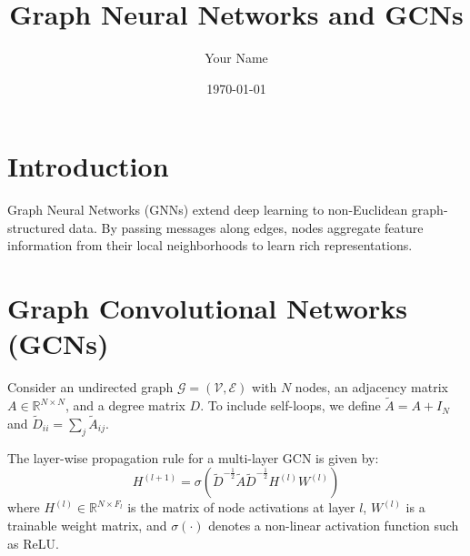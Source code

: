 \documentclass{article}
\begin{document}
\title{Graph Neural Networks and GCNs}
\author{Your Name}
\date{\today}
\maketitle

\section{Introduction}
Graph Neural Networks (GNNs) extend deep learning to non-Euclidean graph-structured data. By passing messages along edges, nodes aggregate feature information from their local neighborhoods to learn rich representations.

\section{Graph Convolutional Networks (GCNs)}
Consider an undirected graph $\mathcal{G} = (\mathcal{V}, \mathcal{E})$ with $N$ nodes, an adjacency matrix $A \in \mathbb{R}^{N \times N}$, and a degree matrix $D$. To include self-loops, we define $\tilde{A} = A + I_N$ and $\tilde{D}_{ii} = \sum_j \tilde{A}_{ij}$.

The layer-wise propagation rule for a multi-layer GCN is given by:
\[
H^{(l+1)} = \sigma\left(\tilde{D}^{-\frac{1}{2}} \tilde{A} \tilde{D}^{-\frac{1}{2}} H^{(l)} W^{(l)}\right)
\]
where $H^{(l)} \in \mathbb{R}^{N \times F_l}$ is the matrix of node activations at layer $l$, $W^{(l)}$ is a trainable weight matrix, and $\sigma(\cdot)$ denotes a non-linear activation function such as ReLU.
\end{document}
